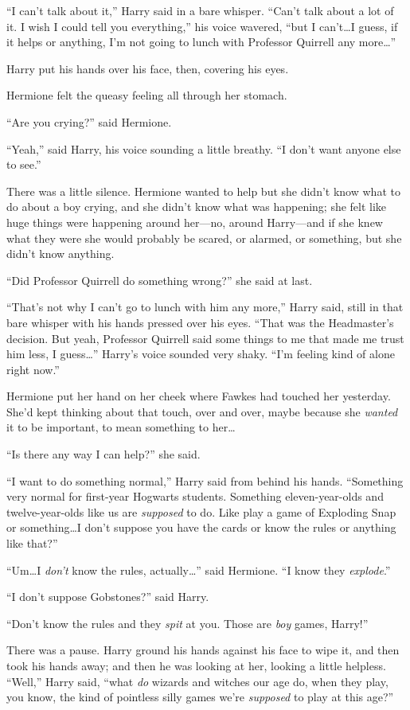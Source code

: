 “I can’t talk about it,” Harry said in a bare whisper. “Can’t talk about a lot of it. I wish I could tell you everything,” his voice wavered, “but I can’t…I guess, if it helps or anything, I’m not going to lunch with Professor Quirrell any more…”

Harry put his hands over his face, then, covering his eyes.

Hermione felt the queasy feeling all through her stomach.

“Are you crying?” said Hermione.

“Yeah,” said Harry, his voice sounding a little breathy. “I don’t want anyone else to see.”

There was a little silence. Hermione wanted to help but she didn’t know what to do about a boy crying, and she didn’t know what was happening; she felt like huge things were happening around her—no, around Harry—and if she knew what they were she would probably be scared, or alarmed, or something, but she didn’t know anything.

“Did Professor Quirrell do something wrong?” she said at last.

“That’s not why I can’t go to lunch with him any more,” Harry said, still in that bare whisper with his hands pressed over his eyes. “That was the Headmaster’s decision. But yeah, Professor Quirrell said some things to me that made me trust him less, I guess…” Harry’s voice sounded very shaky. “I’m feeling kind of alone right now.”

Hermione put her hand on her cheek where Fawkes had touched her yesterday. She’d kept thinking about that touch, over and over, maybe because she \emph{wanted} it to be important, to mean something to her…

“Is there any way I can help?” she said.

“I want to do something normal,” Harry said from behind his hands. “Something very normal for first-year Hogwarts students. Something eleven-year-olds and twelve-year-olds like us are \emph{supposed} to do. Like play a game of Exploding Snap or something…I don’t suppose you have the cards or know the rules or anything like that?”

“Um…I \emph{don’t} know the rules, actually…” said Hermione. “I know they \emph{explode}.”

“I don’t suppose Gobstones?” said Harry.

“Don’t know the rules and they \emph{spit} at you. Those are \emph{boy} games, Harry!”

There was a pause. Harry ground his hands against his face to wipe it, and then took his hands away; and then he was looking at her, looking a little helpless. “Well,” Harry said, “what \emph{do} wizards and witches our age do, when they play, you know, the kind of pointless silly games we’re \emph{supposed} to play at this age?”

